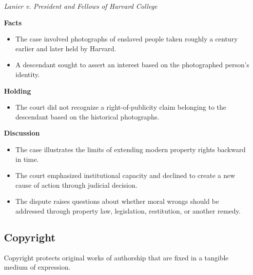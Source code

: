 \documentclass[11pt]{tex/lawoutline}
\begin{document}
\casebox
{\textit{Lanier v. President and Fellows of Harvard College}}
{}
{
\textbf{Facts}
\begin{itemize}
    \item The case involved photographs of enslaved people taken roughly a century earlier and later held by Harvard.
    \item A descendant sought to assert an interest based on the photographed person's identity.
\end{itemize}

\textbf{Holding}
\begin{itemize}
    \item The court did not recognize a right-of-publicity claim belonging to the descendant based on the historical photographs.
\end{itemize}

\textbf{Discussion}
\begin{itemize}
    \item The case illustrates the limits of extending modern property rights backward in time.
    \item The court emphasized institutional capacity and declined to create a new cause of action through judicial decision.
    \item The dispute raises questions about whether moral wrongs should be addressed through property law, legislation, restitution, or another remedy.
\end{itemize}
}

\subsection{Copyright}

{
Copyright protects original works of authorship that are fixed in a tangible medium of expression.
}

\end{document}
